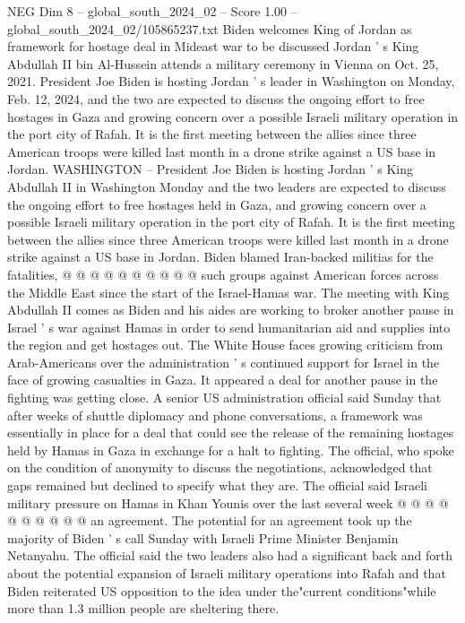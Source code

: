 \begin{textsample}{NEG Dim 8 – global\_south\_2024\_02 – Score 1.00 – global\_south\_2024\_02/105865237.txt}  \label{ex:f8_neg_257}
Biden welcomes King of Jordan as framework for hostage deal in Mideast war to be discussed Jordan ' s King Abdullah II bin Al-Hussein attends a military ceremony in Vienna on Oct. 25, 2021.
President Joe Biden is hosting Jordan ' s leader in Washington on Monday, Feb. 12, 2024, and the two are expected to discuss the ongoing effort to free hostages in Gaza and growing concern over a possible Israeli military operation in the port city of Rafah.
It is the first meeting between the allies since three American troops were killed last month in a drone strike against a US base in Jordan.
WASHINGTON -- President Joe Biden is hosting Jordan ' s King Abdullah II in Washington Monday and the two leaders are expected to discuss the ongoing effort to free hostages held in Gaza, and growing concern over a possible Israeli military operation in the port city of Rafah.
It is the first meeting between the allies since three American troops were killed last month in a drone strike against a US base in Jordan.
Biden blamed Iran-backed militias for the fatalities, @ @ @ @ @ @ @ @ @ @ such groups against American forces across the Middle East since the start of the Israel-Hamas war.
The meeting with King Abdullah II comes as Biden and his aides are working to broker another pause in Israel ' s war against Hamas in order to send humanitarian aid and supplies into the region and get hostages out.
The White House faces growing criticism from Arab-Americans over the administration ' s continued support for Israel in the face of growing casualties in Gaza.
It appeared a deal for another pause in the fighting was getting close.
A senior US administration official said Sunday that after weeks of shuttle diplomacy and phone conversations, a framework was essentially in place for a deal that could see the release of the remaining hostages held by Hamas in Gaza in exchange for a halt to fighting.
The official, who spoke on the condition of anonymity to discuss the negotiations, acknowledged that gaps remained but declined to specify what they are.
The official said Israeli military pressure on Hamas in Khan Younis over the last several week @ @ @ @ @ @ @ @ @ @ an agreement.
The potential for an agreement took up the majority of Biden ' s call Sunday with Israeli Prime Minister Benjamin Netanyahu.
The official said the two leaders also had a significant back and forth about the potential expansion of Israeli military operations into Rafah and that Biden reiterated US opposition to the idea under the"current conditions"while more than 1.3 million people are sheltering there.

\end{textsample}
